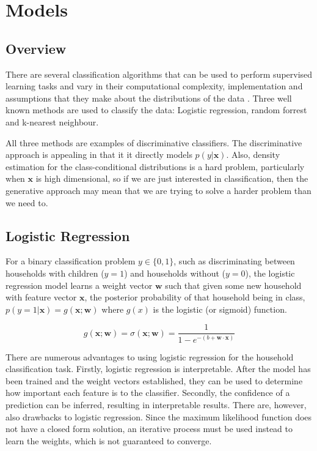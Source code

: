 
\chapter{Models}

\section{Overview}
There are several classification algorithms that can be used to perform supervised learning tasks and vary in their computational complexity, implementation and assumptions that they make about the distributions of the data \cite{Beckel_3}. Three well known methods are used to classify the data: Logistic regression, random forrest and k-nearest neighbour.

All three methods are examples of discriminative classifiers. The discriminative approach is appealing in that it it directly models $p(y|\textbf{x})$. Also, density estimation for the class-conditional distributions is a hard problem, particularly when $\textbf{x}$ is high dimensional, so if we are just interested in classification, then the generative approach may mean that we are trying to solve a harder problem than we need to\cite{Williams}.

\section{Logistic Regression}
For a binary classification problem $y\in \{0,1\}$, such as discriminating between households with children ($y=1$) and households without ($y=0$), the logistic regression model learns a weight vector $\textbf{w}$ such that given some new household with feature vector $\textbf{x}$, the posterior probability of that household being in class, $p(y=1|\textbf{x})=g(\textbf{x}; \textbf{w})$ where $g(x)$ is the logistic (or sigmoid) function.

\[g(\textbf{x}; \textbf{w})=\sigma(\textbf{x};\textbf{w})=\frac{1}{1-e^{-(b+\textbf{w}\cdot{\textbf{x}})}}\]

There are numerous advantages to using logistic regression for the household classification task. Firstly, logistic regression is interpretable. After the model has been trained and the weight vectors established, they can be used to determine how important each feature is to the classifier. Secondly, the confidence of a prediction can be inferred, resulting in interpretable results. There are, however, also drawbacks to logistic regression. Since the maximum likelihood function does not have a closed form solution, an iterative process must be used instead to learn the weights, which is not guaranteed to converge. 


